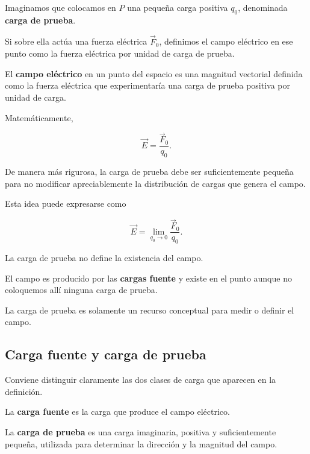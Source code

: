Imaginamos que colocamos en \(P\) una pequeña carga positiva \(q_0\), denominada
\textbf{carga de prueba}.

Si sobre ella actúa una fuerza eléctrica \(\vec F_0\), definimos el campo eléctrico
en ese punto como la fuerza eléctrica por unidad de carga de prueba.

\begin{definicion}

El \textbf{campo eléctrico} en un punto del espacio es una magnitud vectorial
definida como la fuerza eléctrica que experimentaría una carga de prueba positiva
por unidad de carga.

\end{definicion}

Matemáticamente,

\begin{equation}
\boxed{\vec E=\frac{\vec F_0}{q_0}}.
\label{eq:definicion_campo_electrico}
\end{equation}

De manera más rigurosa, la carga de prueba debe ser suficientemente pequeña para
no modificar apreciablemente la distribución de cargas que genera el campo.

Esta idea puede expresarse como

\begin{equation}
\boxed{\vec E=\lim_{q_0\to0}\frac{\vec F_0}{q_0}}.
\end{equation}

\begin{idea}

La carga de prueba no define la existencia del campo.

El campo es producido por las \textbf{cargas fuente} y existe en el punto aunque
no coloquemos allí ninguna carga de prueba.

La carga de prueba es solamente un recurso conceptual para medir o definir el
campo.

\end{idea}


\subsection{Carga fuente y carga de prueba}

Conviene distinguir claramente las dos clases de carga que aparecen en la
definición.

La \textbf{carga fuente} es la carga que produce el campo eléctrico.

La \textbf{carga de prueba} es una carga imaginaria, positiva y suficientemente
pequeña, utilizada para determinar la dirección y la magnitud del campo.

